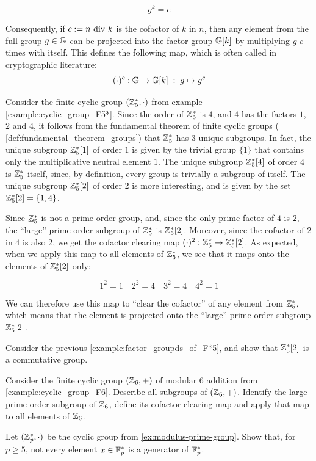 \begin{equation}
g^k = e
\end{equation}

Consequently, if $c:=n \text{ div } k$ is the cofactor of $k$ in $n$, then any element from the full group $g\in \mathbb{G}$ can be projected into the factor group $\mathbb{G}[k]$ by multiplying $g$ $c$-times with itself. This defines the following map, which is often called  in cryptographic literature:
\begin{equation}
\label{def:cofactor_clearing}
(\cdot)^c: \mathbb{G} \to \mathbb{G}[k]\; : \; g \mapsto g^c
\end{equation}

\begin{example}\label{example:factor_groupds_of_F*5} Consider the finite cyclic group $(\mathbb{Z}_5^*,\cdot)$ from example \ref{example:cyclic_group_F5*}. Since the order of $\mathbb{Z}^*_5$ is $4$, and $4$ has the factors $1$, $2$ and $4$, it follows from the fundamental theorem of finite cyclic groups ( \ref{def:fundamental_theorem_groups}) that $\mathbb{Z}^*_5$ has $3$ unique subgroups. In fact, the unique subgroup $\mathbb{Z}^*_5[1]$ of order $1$ is given by the trivial group $\{1\}$ that contains only the multiplicative neutral element $1$. The unique subgroup $\mathbb{Z}^*_5[4]$ of order $4$ is $\mathbb{Z}^*_5$ itself, since, by definition, every group is trivially a subgroup of itself. The unique subgroup $\mathbb{Z}^*_5[2]$ of order $2$ is more interesting, and is given by the set $\mathbb{Z}^*_5[2]=\{1,4\}$.

Since $\mathbb{Z}^*_5$ is not a prime order group, and, since the only prime factor of $4$ is $2$, the ``large'' prime order subgroup of $\mathbb{Z}^*_5$ is $\mathbb{Z}^*_5[2]$. Moreover, since the cofactor of $2$ in $4$ is also $2$, we get the cofactor clearing map $(\cdot)^2:\mathbb{Z}^*_5 \to \mathbb{Z}^*_5[2]$.  As expected, when we apply this map to all elements of $\mathbb{Z}^*_5$, we see that it maps onto the elements of $\mathbb{Z}^*_5[2]$ only:

\begin{equation}
1^2 = 1\quad{}  2^2 = 4\quad{}  3^2 = 4\quad{}  4^2 = 1
\end{equation}

We can therefore use this map to ``clear the cofactor'' of any element from $\mathbb{Z}^*_5$, which means that the element is projected onto the ``large'' prime order subgroup $\mathbb{Z}^*_5[2]$.
\end{example}
\begin{exercise}Consider the previous \examplename{} \ref{example:factor_groupds_of_F*5}, and show that $\mathbb{Z}^*_5[2]$ is a commutative group.
\end{exercise}
\begin{exercise}
Consider the finite cyclic group $(\mathbb{Z}_6,+)$ of modular 6 addition from \examplename{} \ref{example:cyclic_group_F6}. Describe all subgroups of $(\mathbb{Z}_6,+)$. Identify the large prime order subgroup of $\mathbb{Z}_6$, define its cofactor clearing map and apply that map to all elements of $\mathbb{Z}_6$.
\end{exercise}
\begin{exercise}Let $(\mathbb{Z}_p^*,\cdot)$ be the cyclic group from \exercisename{} \ref{ex:modulus-prime-group}. Show that, for $p\geq 5$, not every element $x\in \mathbb{F}_p^*$ is a generator of $\mathbb{F}_p^*$.
\end{exercise}
